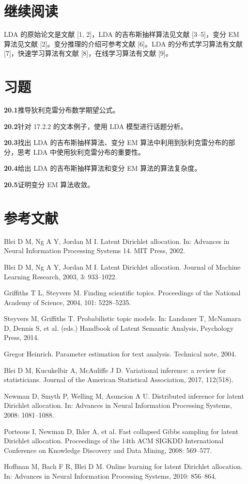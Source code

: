 \documentclass[UTF8, 12pt, fontset=fandol, oneside]{ctexart}
\begin{document}
\section*{继续阅读}

LDA 的原始论文是文献 [1, 2]，LDA 的吉布斯抽样算法见文献 [3--5]，变分 EM 算法见文献 [2]。变分推理的介绍可参考文献 [6]。LDA 的分布式学习算法有文献 [7]，快速学习算法有文献 [8]，在线学习算法有文献 [9]。

\section*{习题}

\noindent\textbf{20.1}\quad 推导狄利克雷分布数学期望公式。

\noindent\textbf{20.2}\quad 针对 17.2.2 的文本例子，使用 LDA 模型进行话题分析。

\noindent\textbf{20.3}\quad 找出 LDA 的吉布斯抽样算法、变分 EM 算法中利用到狄利克雷分布的部分，思考 LDA 中使用狄利克雷分布的重要性。

\noindent\textbf{20.4}\quad 给出 LDA 的吉布斯抽样算法和变分 EM 算法的算法复杂度。

\noindent\textbf{20.5}\quad 证明变分 EM 算法收敛。

\section*{参考文献}

\noindent [1]\quad Blei D M, Ng A Y, Jordan M I. Latent Dirichlet allocation. In: Advances in Neural Information Processing Systems 14. MIT Press, 2002.

\noindent [2]\quad Blei D M, Ng A Y, Jordan M I. Latent Dirichlet allocation. Journal of Machine Learning Research, 2003, 3: 933--1022.

\noindent [3]\quad Griffiths T L, Steyvers M. Finding scientific topics. Proceedings of the National Academy of Science, 2004, 101: 5228--5235.

\noindent [4]\quad Steyvers M, Griffiths T. Probabilistic topic models. In: Landauer T, McNamara D, Dennis S, et al. (eds.) Handbook of Latent Semantic Analysis, Psychology Press, 2014.

\noindent [5]\quad Gregor Heinrich. Parameter estimation for text analysis. Technical note, 2004.

\noindent [6]\quad Blei D M, Kucukelbir A, McAuliffe J D. Variational inference: a review for statisticians. Journal of the American Statistical Association, 2017, 112(518).

\noindent [7]\quad Newman D, Smyth P, Welling M, Asuncion A U. Distributed inference for latent Dirichlet allocation. In: Advances in Neural Information Processing Systems, 2008: 1081--1088.

\noindent [8]\quad Porteous I, Newman D, Ihler A, et al. Fast collapsed Gibbs sampling for latent Dirichlet allocation. Proceedings of the 14th ACM SIGKDD International Conference on Knowledge Discovery and Data Mining, 2008: 569--577.

\noindent [9]\quad Hoffman M, Bach F R, Blei D M. Online learning for latent Dirichlet allocation. In: Advances in Neural Information Processing Systems, 2010: 856--864.
\end{document}
